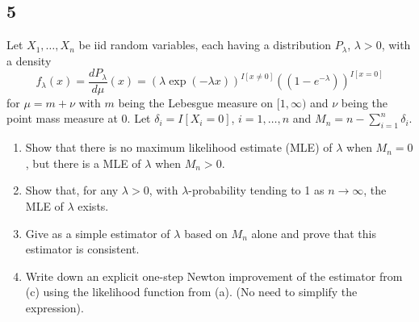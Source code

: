 \documentclass[12pt]{article}
\begin{document}
\subsection*{5}
\begin{tcolorbox}
  Let $X_1,\ldots,X_n$ be iid random variables, each having a distribution $P_\lambda$, $\lambda>0$, with a density \[
    f_\lambda(x) = \frac{d P_\lambda}{d \mu}(x) =  \left(\lambda\exp(-\lambda x)\right)^{I[x\neq0]} \left((1-e^{-\lambda})\right)^{I[x=0]}
  \]
  for $\mu=m+\nu$ with $m$ being the Lebesgue measure on $[1,\infty)$ and $\nu$ being the point mass measure at $0$. Let $\delta_i= I[X_i=0]$, $i=1,\ldots,n$ and $M_n = n- \sum_{i=1}^n \delta_i$.
  \begin{enumerate}[label=(\alph*)]
    \item Show that there is no maximum likelihood estimate (MLE) of $\lambda$ when $M_n=0$, but there is a MLE of $\lambda$ when $M_n>0$.
    \item  Show that, for any $\lambda>0$, with $\lambda$-probability tending to 1 as $n\rightarrow \infty$, the MLE of $\lambda$ exists.
    \item Give  as a simple estimator of $\lambda$ based on $M_n$ alone and prove that this estimator is consistent.
    \item Write down an explicit one-step Newton improvement of the estimator from (c) using the likelihood function from (a). (No need to simplify the expression).
  \end{enumerate}
\end{tcolorbox}
\end{document}
